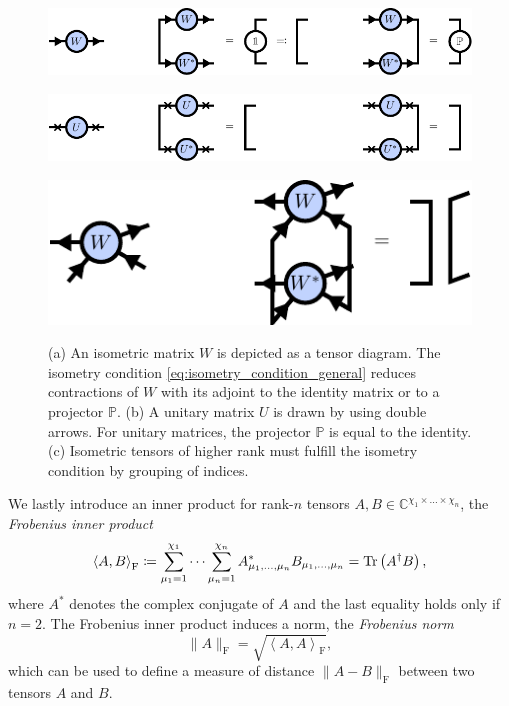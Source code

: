 \begin{figure}[ht]
	\centering
	\subcaptionbox{\label{fig:basic_isometries_isometric_matrix}}
	{%
		\includegraphics[scale=1]{figures/tikz/Tensor_Networks/basic_isometries/basic_isometries_a.pdf}
	}
	\par\bigskip
	\subcaptionbox{\label{fig:basic_isometries_unitary_matrix}}
	{%
	\includegraphics[scale=1]{figures/tikz/Tensor_Networks/basic_isometries/basic_isometries_c.pdf}
	}
	\par\bigskip
	\subcaptionbox{\label{fig:basic_isometries_isometric_tensor}}
	{%
		\includegraphics[scale=1]{figures/tikz/Tensor_Networks/basic_isometries/basic_isometries_b.pdf}
	}
	\caption{(a) An isometric matrix $W$ is depicted as a tensor diagram. The isometry condition \eqref{eq:isometry_condition_general} reduces contractions of $W$ with its adjoint to the identity matrix or to a projector $\mathbb{P}$. (b) A unitary matrix $U$ is drawn by using double arrows. For unitary matrices, the projector $\mathbb{P}$ is equal to the identity. (c) Isometric tensors of higher rank must fulfill the isometry condition by grouping of indices.}
	\label{fig:isometries_and_unitaries_diagrams}
\end{figure}
We lastly introduce an inner product for rank-$n$ tensors $A, B \in \mathbb{C}^{\chi_1\times\dots\times\chi_n}$, the \textit{Frobenius inner product}
\begin{equation}
	\label{eq:frobenius_inner_product}
	\left\langle A, B\right\rangle_\text{F} \coloneqq \sum_{\mu_1=1}^{\chi_1} \dots \sum_{\mu_n=1}^{\chi_n} A_{\mu_1,\dots,\mu_n}^*B_{\mu_1,\dots,\mu_n} = \operatorname{Tr}\left(A^\dagger B\right),
\end{equation}
where $A^*$ denotes the complex conjugate of $A$ and the last equality holds only if $n = 2$. The Frobenius inner product induces a norm, the \textit{Frobenius norm}
\begin{equation}
	\label{eq:frobenius_norm}
	\lVert A\rVert_\text{F} = \sqrt{\left\langle A, A\right\rangle_\text{F}},
\end{equation}
which can be used to define a measure of distance $\lVert A-B\rVert_\text{F}$ between two tensors $A$ and $B$.